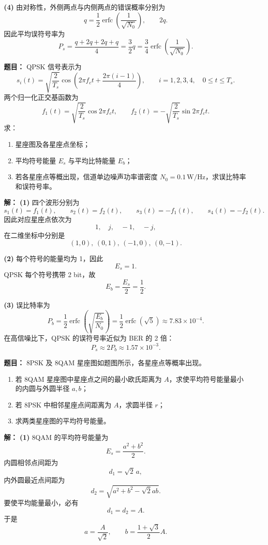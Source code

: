 \textbf{(4)} 由对称性，外侧两点与内侧两点的错误概率分别为
\[
q=\frac12\operatorname{erfc}\!\left(\frac{1}{\sqrt{N_0}}\right),
\qquad
2q.
\]
因此平均误符号率为
\[
P_s=\frac{q+2q+2q+q}{4}
=\frac32 q
=\frac34\operatorname{erfc}\!\left(\frac{1}{\sqrt{N_0}}\right).
\]

\medskip
{}
\textbf{题目：}
QPSK 信号表示为
\[
s_i(t)=\sqrt{\frac{2}{T_s}}
\cos\!\left(2\pi f_ct+\frac{2\pi(i-1)}{4}\right),
\qquad i=1,2,3,4,\quad 0\le t\le T_s.
\]
两个归一化正交基函数为
\[
f_1(t)=\sqrt{\frac{2}{T_s}}\cos 2\pi f_ct,\qquad
f_2(t)=-\sqrt{\frac{2}{T_s}}\sin 2\pi f_ct.
\]
求：
\begin{enumerate}
\item 星座图及各星座点坐标；
\item 平均符号能量 $E_s$ 与平均比特能量 $E_b$；
\item 若各星座点等概出现，信道单边噪声功率谱密度 $N_0=0.1\,\mathrm{W/Hz}$，求误比特率和误符号率。
\end{enumerate}

\par\textbf{解：}
\textbf{(1)} 四个波形分别为
\[
s_1(t)=f_1(t),\qquad s_2(t)=f_2(t),\qquad s_3(t)=-f_1(t),\qquad s_4(t)=-f_2(t).
\]
因此对应星座点依次为
\[
1,\quad j,\quad -1,\quad -j,
\]
在二维坐标中分别是
\[
(1,0),\ (0,1),\ (-1,0),\ (0,-1).
\]

\textbf{(2)} 每个符号的能量均为 1，因此
\[
E_s=1.
\]
QPSK 每个符号携带 2 bit，故
\[
E_b=\frac{E_s}{2}=\frac12.
\]

\textbf{(3)} 误比特率为
\[
P_b=\frac12\operatorname{erfc}\!\left(\sqrt{\frac{E_b}{N_0}}\right)
=\frac12\operatorname{erfc}(\sqrt{5})
\approx 7.83\times 10^{-4}.
\]
在高信噪比下，QPSK 的误符号率近似为 BER 的 2 倍：
\[
P_s\approx 2P_b\approx 1.57\times 10^{-3}.
\]

\medskip
{}
\textbf{题目：}
8PSK 及 8QAM 星座图如题图所示，各星座点等概率出现。
\begin{enumerate}
\item 若 8QAM 星座图中星座点之间的最小欧氏距离为 $A$，求使平均符号能量最小的内圆与外圆半径 $a,b$；
\item 若 8PSK 中相邻星座点间距离为 $A$，求圆半径 $r$；
\item 求两类星座图的平均符号能量。
\end{enumerate}

\par\textbf{解：}
\textbf{(1)} 8QAM 的平均符号能量为
\[
E_s=\frac{a^2+b^2}{2}.
\]
内圆相邻点间距为
\[
d_1=\sqrt2\,a,
\]
内外圆最近点间距为
\[
d_2=\sqrt{a^2+b^2-\sqrt2ab}.
\]
要使平均能量最小，必有
\[
d_1=d_2=A.
\]
于是
\[
a=\frac{A}{\sqrt2},
\qquad
b=\frac{1+\sqrt3}{2}A.
\]

